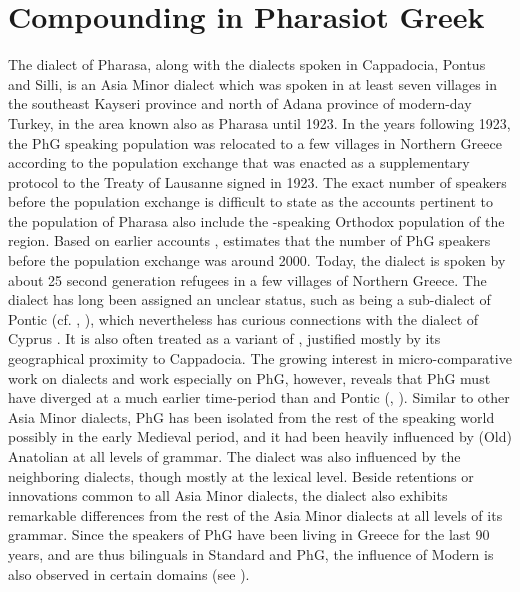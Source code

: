 \documentclass[output=paper]{LSP/langsci}
\begin{document}
\section{Compounding in Pharasiot Greek}
The dialect of Pharasa, along with the dialects spoken in Cappadocia, Pontus and Silli, is an Asia Minor  dialect which was spoken in at least seven villages in the southeast Kayseri province and north of Adana province of modern-day Turkey, in the area known also as Pharasa \citep{Dawkins1916} until 1923. In the years following 1923, the PhG speaking population was relocated to a few villages in Northern Greece according to the population exchange that was enacted as a supplementary protocol to the Treaty of Lausanne signed in 1923. The exact number of speakers before the population exchange is difficult to state as the accounts pertinent to the population of Pharasa also include the -speaking Orthodox population of the region. Based on earlier accounts \citep{Xenofanis,Sarantidis1899,Kyrillos,Dawkins1916}, \citet{Bagriacik} estimates that the number of PhG speakers before the population exchange was around 2000. Today, the dialect is spoken by about 25  second generation refugees in a few villages of Northern Greece. The dialect has long been assigned an unclear status, such as being a sub-dialect of Pontic (cf. \citealt{Dawkins1916}, \citealt[27]{Dawkins1937}), which nevertheless has curious connections with the dialect of Cyprus \citep[22]{Dawkins1940}. It is also often treated as a variant of  \citep{Anastasios1976}, justified mostly by its geographical proximity to Cappadocia. The growing interest in micro-comparative work on  dialects and work especially on PhG, however, reveals that PhG must have diverged at a much earlier time-period than  and Pontic (\citealt{Karatsareas2011}, \citealt{Bagriacik}). Similar to other Asia Minor  dialects, PhG has been isolated from the rest of the  speaking world possibly in the early Medieval  period, and it had been heavily influenced by (Old) Anatolian  at all levels of grammar. The dialect was also influenced by the neighboring  dialects, though mostly at the lexical level. Beside retentions or innovations common to all Asia Minor  dialects, the dialect also exhibits remarkable differences from the rest of the Asia Minor  dialects at all levels of its grammar. Since the speakers of PhG have been living in Greece for the last 90 years, and are thus bilinguals in Standard  and PhG, the influence of Modern  is also observed in certain domains (see \citealt{Bagriacik}).
\end{document}
